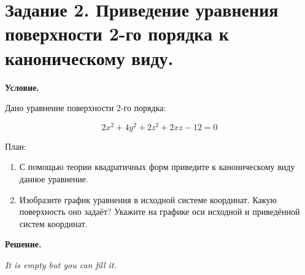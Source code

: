 \section{Задание 2. Приведение уравнения поверхности 2-го порядка к каноническому виду.}

\textbf{Условие.}

Дано уравнение поверхности 2-го порядка:

\[2x^2 + 4y^2 + 2z^2 + 2xz -12 = 0\]

План:
\begin{enumerate}
    \item С помощью теории квадратичных форм приведите к каноническому виду данное уравнение.
    \item Изобразите график уравнения в исходной системе координат.
Какую поверхность оно задаёт? Укажите на графике оси исходной и приведённой систем координат.
\end{enumerate}

\vspace{10mm}
\textbf{Решение.}

\textit{It is empty but you can fill it.}

\clearpage